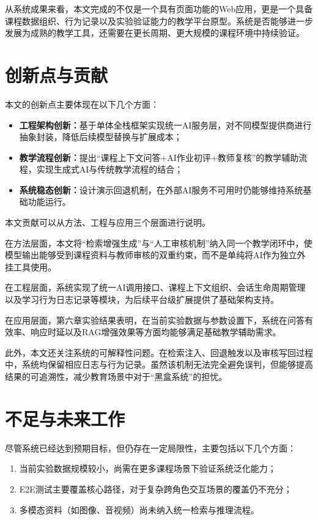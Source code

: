 \documentclass[12pt,a4paper,oneside]{ctexbook}
\numberwithin{equation}{chapter}
\begin{document}
从系统成果来看，本文完成的不仅是一个具有页面功能的Web应用，更是一个具备课程数据组织、行为记录以及实验验证能力的教学平台原型。系统是否能够进一步发展为成熟的教学工具，还需要在更长周期、更大规模的课程环境中持续验证。

\section{创新点与贡献}

本文的创新点主要体现在以下几个方面：

\begin{itemize}
  \item \textbf{工程架构创新：}基于单体全栈框架实现统一AI服务层，对不同模型提供商进行抽象封装，降低后续模型替换与扩展成本；
  \item \textbf{教学流程创新：}提出“课程上下文问答+AI作业初评+教师复核”的教学辅助流程，实现生成式AI与传统教学流程的结合；
  \item \textbf{系统稳态创新：}设计演示回退机制，在外部AI服务不可用时仍能够维持系统基础功能运行。
\end{itemize}

本文贡献可以从方法、工程与应用三个层面进行说明。

在方法层面，本文将“检索增强生成”与“人工审核机制”纳入同一个教学闭环中，使模型输出能够受到课程资料与教师审核的双重约束，而不是单纯将AI作为独立外挂工具使用。

在工程层面，系统实现了统一AI调用接口、课程上下文组织、会话生命周期管理以及学习行为日志记录等模块，为后续平台级扩展提供了基础架构支持。

在应用层面，第六章实验结果表明，在当前实验数据与参数设置下，系统在问答有效率、响应时延以及RAG增强效果等方面均能够满足基础教学辅助需求。

此外，本文还关注系统的可解释性问题。在检索注入、回退触发以及审核写回过程中，系统均保留相应日志与行为记录。虽然该机制无法完全避免误判，但能够提高结果的可追溯性，减少教育场景中对于“黑盒系统”的担忧。

\section{不足与未来工作}

尽管系统已经达到预期目标，但仍存在一定局限性，主要包括以下几个方面：

\begin{enumerate}[label=(\arabic*)]
  \item 当前实验数据规模较小，尚需在更多课程场景下验证系统泛化能力；
  \item E2E测试主要覆盖核心路径，对于复杂跨角色交互场景的覆盖仍不充分；
  \item 多模态资料（如图像、音视频）尚未纳入统一检索与推理流程。
\end{enumerate}
\end{document}
